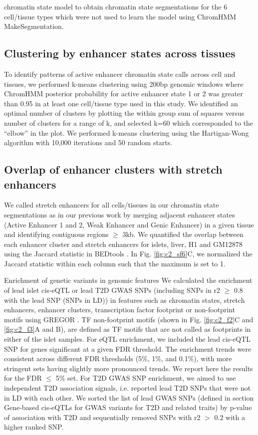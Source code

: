 chromatin state model to obtain chromatin state segmentations for the 6 cell/tissue types which were not used to learn the model using ChromHMM MakeSegmentation. 

\subsection{Clustering by enhancer states across tissues} 
To identify patterns of active enhancer chromatin state calls across cell and tissues, we performed k-means clustering using 200bp genomic windows where ChromHMM posterior probability for active enhancer state 1 or 2 was greater than 0.95 in at least one cell/tissue type used in this study. We identified an optimal number of clusters by plotting the within group sum of squares versus number of clusters for a range of k, and selected k=60 which corresponded to the “elbow” in the plot. We performed k-means clustering using the Hartigan-Wong algorithm with 10,000 iterations and 50 random starts.

\subsection{Overlap of enhancer clusters with stretch enhancers}
We called stretch enhancers for all cells/tissues in our chromatin state segmentations as in our previous work  \cite{scottGeneticRegulatorySignature2016, parkerChromatinStretchEnhancer2013} by merging adjacent enhancer states (Active Enhancer 1 and 2, Weak Enhancer and Genic Enhancer) in a given tissue and identifying contiguous regions $\geq$ 3kb. We quantified the overlap between each enhancer cluster and stretch enhancers for islets, liver, H1 and GM12878 using the Jaccard statistic in BEDtools \cite{quinlanBEDToolsFlexibleSuite2010}. In Fig. \ref{fig:c2_sf6}C, we normalized the Jaccard statistic within each column such that the maximum is set to 1.

Enrichment of genetic variants in genomic features We calculated the enrichment of lead islet cis-eQTL or lead T2D GWAS SNPs (including SNPs in r2 $\geq$ 0.8 with the lead SNP (SNPs in LD)) in features such as chromatin states, stretch enhancers, enhancer clusters, transcription factor footprint or non-footprint motifs using GREGOR \cite{schmidtGREGOREvaluatingGlobal2015}. TF non-footprint motifs (shown in Fig. \ref{fig:c2_f2}C and \ref{fig:c2_f3}A and B), are defined as TF motifs that are not called as footprints in either of the islet samples. For eQTL enrichment, we included the lead cis-eQTL SNP for genes significant at a given FDR threshold. The enrichment trends were consistent across different FDR thresholds (5\%, 1\%, and 0.1\%), with more stringent sets having slightly more pronounced trends. We report here the results for the FDR $\leq$ 5\% set. For T2D GWAS SNP enrichment, we aimed to use independent T2D association signals, i.e. reported lead T2D SNPs that were not in LD with each other. We sorted the list of lead GWAS SNPs (defined in section Gene-based cis-eQTLs for GWAS variants for T2D and related traits) by p-value of association with T2D and sequentially removed SNPs with r2 $>$ 0.2 with a higher ranked SNP. 

